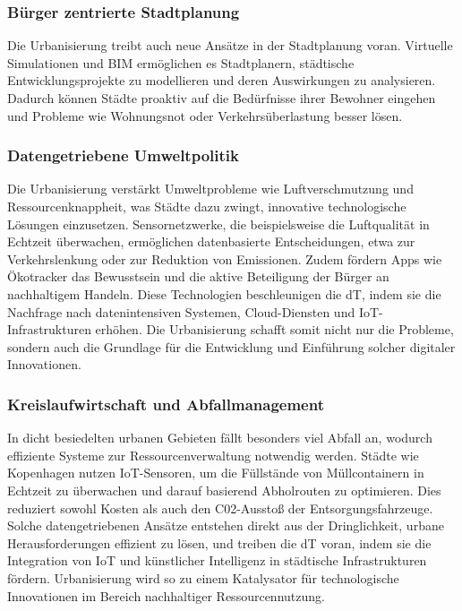 \documentclass[conference,compsoc,final,a4paper, onecolumn, 11pt]{IEEEtran}
\begin{document}
\subsubsection{Bürger zentrierte Stadtplanung}
Die Urbanisierung treibt auch neue Ansätze in der Stadtplanung voran. 
Virtuelle Simulationen und \ac{BIM} ermöglichen es Stadtplanern, städtische Entwicklungsprojekte zu modellieren und deren Auswirkungen zu analysieren. 
Dadurch können Städte proaktiv auf die Bedürfnisse ihrer Bewohner eingehen und Probleme wie Wohnungsnot oder Verkehrsüberlastung besser lösen. \autocite{mckinsey_global_institute_smart_2021}


\subsubsection{Datengetriebene Umweltpolitik}
Die Urbanisierung verstärkt Umweltprobleme wie Luftverschmutzung und Ressourcenknappheit, was Städte dazu zwingt, innovative technologische Lösungen einzusetzen. 
Sensornetzwerke, die beispielsweise die Luftqualität in Echtzeit überwachen, ermöglichen datenbasierte Entscheidungen, etwa zur Verkehrslenkung oder zur Reduktion von Emissionen. 
Zudem fördern Apps wie Ökotracker das Bewusstsein und die aktive Beteiligung der Bürger an nachhaltigem Handeln. 
Diese Technologien beschleunigen die \ac{dT}, indem sie die Nachfrage nach datenintensiven Systemen, Cloud-Diensten und \ac{IoT}-Infrastrukturen erhöhen. 
Die Urbanisierung schafft somit nicht nur die Probleme, sondern auch die Grundlage für die Entwicklung und Einführung solcher digitaler Innovationen. \autocite{sensors_smart_2015}

 
\subsubsection{Kreislaufwirtschaft und Abfallmanagement}
In dicht besiedelten urbanen Gebieten fällt besonders viel Abfall an, wodurch effiziente Systeme zur Ressourcenverwaltung notwendig werden. 
Städte wie Kopenhagen nutzen \ac{IoT}-Sensoren, um die Füllstände von Müllcontainern in Echtzeit zu überwachen und darauf basierend Abholrouten zu optimieren. 
Dies reduziert sowohl Kosten als auch den C02-Ausstoß der Entsorgungsfahrzeuge. 
Solche datengetriebenen Ansätze entstehen direkt aus der Dringlichkeit, urbane Herausforderungen effizient zu lösen, und treiben die \ac{dT} voran, indem sie die Integration von IoT und künstlicher Intelligenz in städtische Infrastrukturen fördern. 
Urbanisierung wird so zu einem Katalysator für technologische Innovationen im Bereich nachhaltiger Ressourcennutzung. \autocite{sensors_smart_2015}
\end{document}
